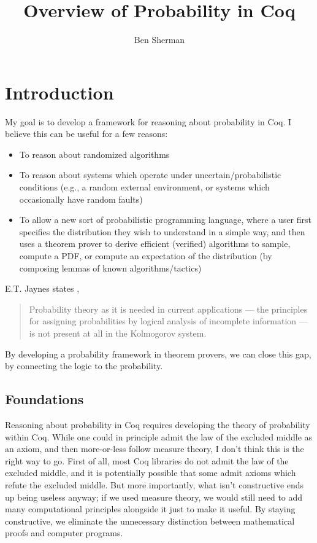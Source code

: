 \documentclass{article}           %
\title{Overview of Probability in Coq}
\author{Ben Sherman}
\begin{document}
\maketitle

\section{Introduction}

My goal is to develop a framework for reasoning about probability in Coq. I believe this can be useful for a few reasons:
\begin{itemize}
\item To reason about randomized algorithms
\item To reason about systems which operate under uncertain/probabilistic conditions (e.g., a random external environment, or systems which occasionally have random faults)
\item To allow a new sort of probabilistic programming language, where a user first specifies the distribution they wish to understand in a simple way, and then uses a theorem prover to derive efficient (verified) algorithms to sample, compute a PDF, or compute an expectation of the distribution (by composing lemmas of known algorithms/tactics)
\end{itemize}

E.T. Jaynes states \cite{jaynes2003},
\begin{quote}
Probability theory as it is needed in current applications --- the principles for assigning probabilities by logical analysis of incomplete information --- is not present at all in the Kolmogorov system.
\end{quote}

By developing a probability framework in theorem provers, we can close this gap, by connecting the logic to the probability.

\subsection{Foundations}

Reasoning about probability in Coq requires developing the theory of probability within Coq. While one could in principle admit the law of the excluded middle as an axiom, and then more-or-less follow measure theory, I don't think this is the right way to go. First of all, most Coq libraries do not admit the law of the excluded middle, and it is potentially possible that some admit axioms which refute the excluded middle. But more importantly, what isn't constructive ends up being useless anyway; if we used measure theory, we would still need to add many computational principles alongside it just to make it useful. By staying constructive, we eliminate the unnecessary distinction between mathematical proofs and computer programs.
\end{document}
